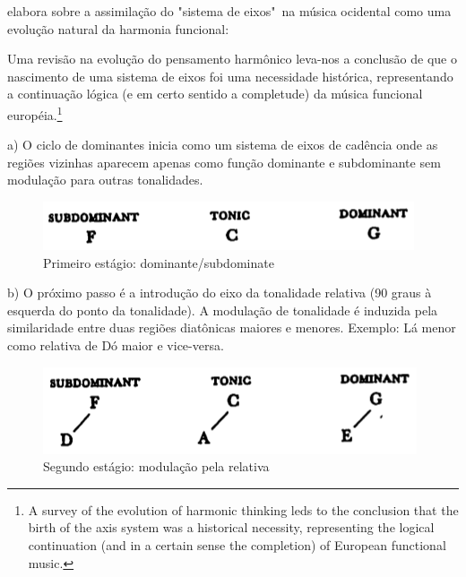 \documentclass[
	12pt,				%
	openright,			%
	twoside,			%
	a4paper,			%
	english,			%
	french,				%
	spanish,			%
	brazil				%
	]{abntex2}
\begin{document}
 elabora sobre a assimilação do "sistema de eixos"\ na música ocidental como uma evolução natural da harmonia funcional:  

\begin{citacao}
Uma revisão na evolução do pensamento harmônico leva-nos a conclusão de que o nascimento de uma sistema de eixos foi uma necessidade histórica, representando a continuação lógica (e em certo sentido a completude) da música funcional européia.\cite[p. 08]{lendvai1971bela}\footnote{A survey of the evolution of harmonic thinking leds to the conclusion that the birth of the axis system was a historical necessity, representing the logical continuation (and in a certain sense the completion) of European functional music.\cite[p. 08]{lendvai1971bela}}
\end{citacao}


a) O ciclo de dominantes inicia como um sistema de eixos de cadência onde as regiões vizinhas aparecem apenas como função dominante e subdominante sem modulação para outras tonalidades. 

\begin{figure}[!h]
	\caption{\label{fig_grafico}Primeiro estágio: dominante/subdominate}
	\begin{center}
	    \includegraphics[scale=0.5]{axis/estagio01.png}
	\end{center}
\end{figure}


b) O próximo passo é a introdução do eixo da tonalidade relativa (90 graus à esquerda do ponto da tonalidade). A modulação de tonalidade é induzida pela similaridade entre duas regiões diatônicas maiores e menores. Exemplo: Lá menor como relativa de Dó maior e vice-versa.

\begin{figure}[!h]
	\caption{\label{fig_grafico}Segundo estágio: modulação pela relativa}
	\begin{center}
	    \includegraphics[scale=0.5]{axis/estagio02.png}
	\end{center}
\end{figure}
\end{document}
